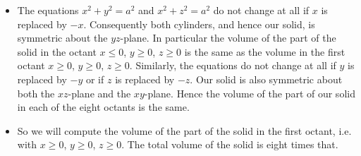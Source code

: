 \begin{eg}[Volume]
\begin{itemize}
\item
The equations $x^2+y^2=a^2$ and $x^2+z^2=a^2$ do not change at all 
if $x$ is replaced by $-x$. Consequently both cylinders, and hence our solid,
is symmetric about the $yz$-plane. In particular the volume of the
part of the solid in the octant $x\le 0$, $y\ge 0$, $z\ge 0$
is the same as the volume in the first octant $x\ge 0$, $y\ge 0$, $z\ge 0$.
Similarly, the equations do not change at all
if $y$ is replaced by $-y$ or if $z$ is replaced by $-z$. Our solid is
also symmetric about both the $xz$-plane and the $xy$-plane. 
Hence the volume of the part of our solid in each of the eight octants 
is the same.

\item So we will compute the volume of the part of 
the solid in the first octant, i.e. with $x\ge 0$, $y\ge 0$, $z\ge 0$.
The total volume of the solid is eight times that.


\end{itemize}
\end{eg}
